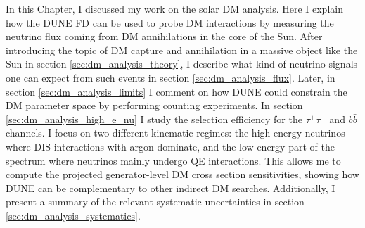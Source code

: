 In this Chapter, I discussed my work on the solar DM analysis. Here I explain how the DUNE FD can be used to probe DM interactions by measuring the neutrino flux coming from DM annihilations in the core of the Sun. After introducing the topic of DM capture and annihilation in a massive object like the Sun in section \ref{sec:dm_analysis_theory}, I describe what kind of neutrino signals one can expect from such events in section \ref{sec:dm_analysis_flux}. Later, in section \ref{sec:dm_analysis_limits} I comment on how DUNE could constrain the DM parameter space by performing counting experiments. In section \ref{sec:dm_analysis_high_e_nu} I study the selection efficiency for the $\tau^{+}\tau^{-}$ and $b\bar{b}$ channels. I focus on two different kinematic regimes: the high energy neutrinos where DIS interactions with argon dominate, and the low energy part of the spectrum where neutrinos mainly undergo QE interactions. This allows me to compute the projected generator-level DM cross section sensitivities, showing how DUNE can be complementary to other indirect DM searches. Additionally, I present a summary of the relevant systematic uncertainties in section \ref{sec:dm_analysis_systematics}.